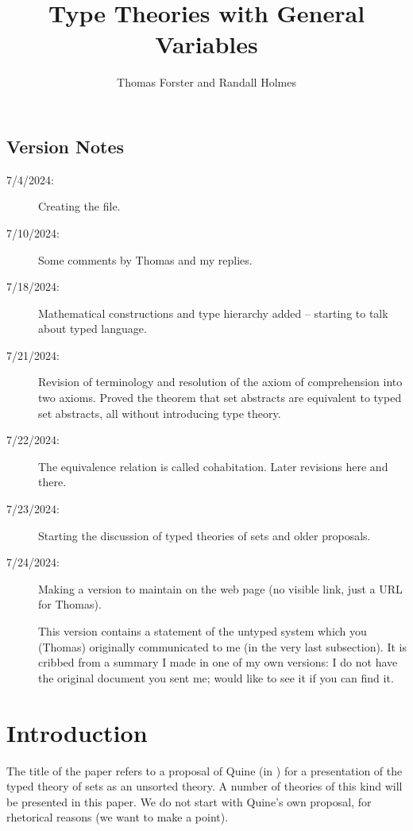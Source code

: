 \documentclass[12pt]{article}
\title{Type Theories with General Variables}
\author{Thomas Forster and Randall Holmes}
\begin{document}
\maketitle

\tableofcontents

\subsection{Version Notes}

\begin{description}

\item[7/4/2024:]  Creating the file.

\item[7/10/2024:]  Some comments by Thomas and my replies.


\item[7/18/2024:]  Mathematical constructions and type hierarchy added -- starting to talk about typed language.

\item[7/21/2024:]  Revision of terminology and resolution of the axiom of comprehension into two axioms.  Proved the theorem that set abstracts are equivalent to typed set abstracts, all without introducing type theory.

\item[7/22/2024:]  The equivalence relation is called cohabitation.  Later revisions here and there.

\item[7/23/2024:]  Starting the discussion of typed theories of sets and older proposals.

\item[7/24/2024:]  Making a version to maintain on the web page (no visible link, just a URL for Thomas).

This version contains a statement of the untyped system which you (Thomas) originally communicated to me (in the very last subsection).  It is cribbed from a summary I made in one of my own versions:  I do not have the original document you sent me;  would like to see it if you can find it.

\end{description}

\newpage

\section{Introduction}

The title of the paper refers to a proposal of Quine (in
\cite{quiettgv}) for a presentation of the typed theory of sets as an
unsorted theory.  A number of theories of this kind will be presented
in this paper.  We do not start with Quine's own proposal, for
rhetorical reasons (we want to make a point).
\end{document}

